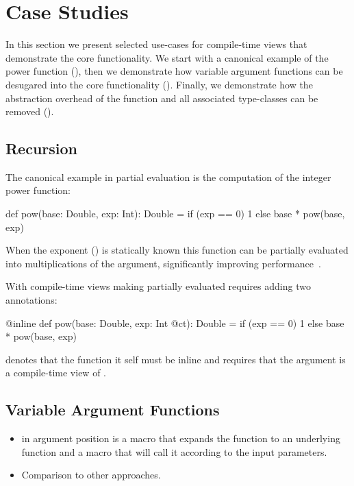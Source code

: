 \section{Case Studies}
\label{sct:case-studies}

In this section we present selected use-cases for compile-time views that demonstrate
 the core functionality. We start with a canonical example of the power function
 (), then we demonstrate how variable argument functions can be
 desugared into the core functionality (). Finally, we demonstrate how
 the abstraction overhead of the  function and all associated type-classes
 can be removed ().

\subsection{Recursion}
\label{sct:recursion}

The canonical example in partial evaluation is the computation of the integer power
 function:

\begin{listing}
def pow(base: Double, exp: Int): Double =
  if (exp == 0) 1 else base * pow(base, exp)
\end{listing}

When the exponent () is statically known this function can be partially
evaluated into  multiplications of the  argument, significantly
improving performance~\cite{}.

With compile-time views making  partially evaluated requires adding two annotations:

\begin{listing}
@inline def pow(base: Double, exp: Int @ct): Double =
  if (exp == 0) 1 else base * pow(base, exp)
\end{listing}

 denotes that the  function it self must be inline and
  requires that the  argument is a compile-time view of .

\subsection{Variable Argument Functions}
\label{sct:varargs}

\begin{itemize}
  \item {} in argument position is a macro that expands the function to an underlying function  and a macro that will call it according to the input parameters.
  \item Comparison to other approaches.
\end{itemize}

